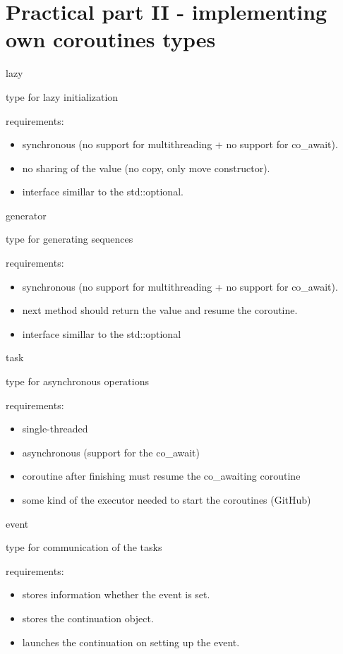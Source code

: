 \documentclass[10pt]{beamer}
\begin{document}
\section{Practical part II - implementing own coroutines types}

\begin{frame}{lazy}
\centerline{type for lazy initialization}
\vfill
requirements:
\begin{itemize}
  \item synchronous (no support for multithreading + no support for co\_await).
  \item no sharing of the value (no copy, only move constructor).
  \item interface simillar to the std::optional.
\end{itemize}
\end{frame}

\begin{frame}{generator}
  \centerline{type for generating sequences}
  \vfill
  requirements:
  \begin{itemize}
    \item synchronous (no support for multithreading + no support for co\_await).
    \item next method should return the value and resume the coroutine.
    \item interface simillar to the std::optional
  \end{itemize}
\end{frame}

\begin{frame}{task}
  \centerline{type for asynchronous operations}
  \vfill
  requirements:
  \begin{itemize}
    \item single-threaded
    \item asynchronous (support for the co\_await)
    \item coroutine after finishing must resume the co\_awaiting coroutine
    \item some kind of the executor needed to start the coroutines (GitHub)
  \end{itemize}
\end{frame}

\begin{frame}{event}
  \centerline{type for communication of the tasks}
  \vfill
  requirements:
  \begin{itemize}
  \item stores information whether the event is set.
  \item stores the continuation object.
  \item launches the continuation on setting up the event.
  \end{itemize}
\end{frame}
\end{document}
